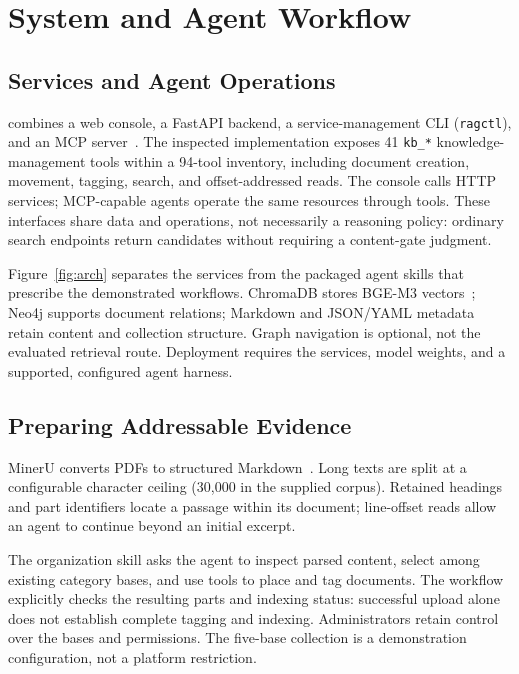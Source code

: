 \section{System and Agent Workflow}
\label{sec:system}

\subsection{Services and Agent Operations}
\sys{} combines a web console, a FastAPI backend, a service-management CLI
(\texttt{ragctl}), and an MCP server~\cite{mcp}. The inspected implementation
exposes 41 \texttt{kb\_*} knowledge-management tools within a 94-tool inventory,
including document creation, movement, tagging, search, and offset-addressed
reads. The console calls HTTP services; MCP-capable agents operate the same
resources through tools. These interfaces share data and operations, not
necessarily a reasoning policy: ordinary search endpoints return candidates
without requiring a content-gate judgment.

Figure~\ref{fig:arch} separates the services from the packaged agent skills
that prescribe the demonstrated workflows. ChromaDB stores BGE-M3
vectors~\cite{bge-m3}; Neo4j supports document relations; Markdown and
JSON/YAML metadata retain content and collection structure. Graph navigation
is optional, not the evaluated retrieval route. Deployment requires the
services, model weights, and a supported, configured agent harness.

\subsection{Preparing Addressable Evidence}
MinerU converts PDFs to structured Markdown~\cite{mineru}. Long texts are
split at a configurable character ceiling (30,000 in the supplied corpus).
Retained headings and part identifiers locate a passage within its document;
line-offset reads allow an agent to continue beyond an initial excerpt.

The organization skill asks the agent to inspect parsed content, select among
existing category bases, and use tools to place and tag documents. The
workflow explicitly checks the resulting parts and indexing status:
successful upload alone does not establish complete tagging and indexing.
Administrators retain control over the bases and permissions. The five-base
collection is a demonstration configuration, not a platform restriction.

